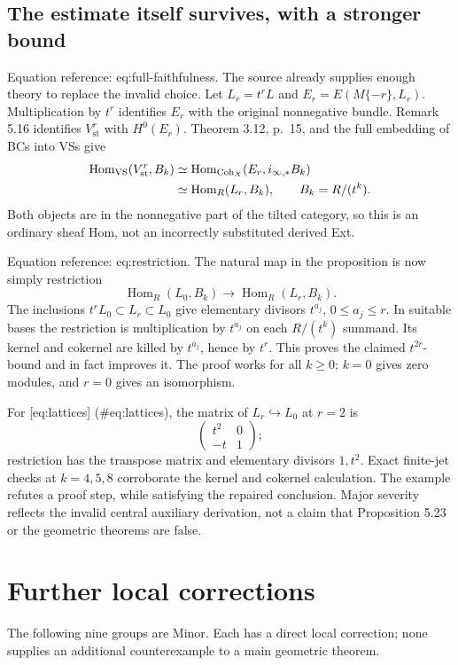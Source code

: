 \documentclass[10pt]{article}
\begin{document}
\subsection*{The estimate itself survives, with a stronger bound}
Equation reference: eq:full-faithfulness. The source already supplies enough theory to replace the invalid choice. Let \(L_r=t^rL\) and \(E_r=E(M\{-r\},L_r)\). Multiplication by \(t^r\) identifies \(E_r\) with the original nonnegative bundle. Remark 5.16 identifies \(V_{\mathrm{st}}^r\) with \(H^0(E_r)\). Theorem 3.12, p. 15, and the full embedding of BCs into VSs give \[\begin{aligned}

 \operatorname{Hom}_{\mathrm{VS}}(V_{\mathrm{st}}^r,B_k)
 &\simeq\operatorname{Hom}_{\operatorname{Coh}_X}(E_r,i_{\infty,*}B_k)\\
 &\simeq\operatorname{Hom}_R(L_r,B_k),\qquad B_k=R/(t^k).\notag\end{aligned}\] Both objects are in the nonnegative part of the tilted category, so this is an ordinary sheaf Hom, not an incorrectly substituted derived Ext.\par
Equation reference: eq:restriction. The natural map in the proposition is now simply restriction \[
 \operatorname{Hom}_R(L_0,B_k)\longrightarrow\operatorname{Hom}_R(L_r,B_k).\] The inclusions \(t^rL_0\subset L_r\subset L_0\) give elementary divisors \(t^{a_j}\), \(0\leq a_j\leq r\). In suitable bases the restriction is multiplication by \(t^{a_j}\) on each \(R/(t^k)\) summand. Its kernel and cokernel are killed by \(t^{a_j}\), hence by \(t^r\). This proves the claimed \(t^{2r}\)-bound and in fact improves it. The proof works for all \(k\geq0\); \(k=0\) gives zero modules, and \(r=0\) gives an isomorphism.\par
For [eq:lattices] (\#eq:lattices), the matrix of \(L_r\hookrightarrow L_0\) at \(r=2\) is \[\begin{pmatrix}t^2&0\\-t&1\end{pmatrix};\] restriction has the transpose matrix and elementary divisors \(1,t^2\). Exact finite-jet checks at \(k=4,5,8\) corroborate the kernel and cokernel calculation. The example refutes a proof step, while satisfying the repaired conclusion. Major severity reflects the invalid central auxiliary derivation, not a claim that Proposition 5.23 or the geometric theorems are false.\par
\section*{Further local corrections}
The following nine groups are Minor. Each has a direct local correction; none supplies an additional counterexample to a main geometric theorem.\par
\end{document}
